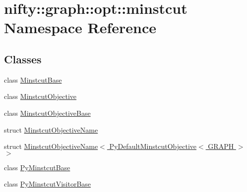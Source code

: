 \hypertarget{namespacenifty_1_1graph_1_1opt_1_1minstcut}{}\section{nifty\+:\+:graph\+:\+:opt\+:\+:minstcut Namespace Reference}
\label{namespacenifty_1_1graph_1_1opt_1_1minstcut}
\subsection*{Classes}
\begin{DoxyCompactItemize}
\item 
class \hyperlink{classnifty_1_1graph_1_1opt_1_1minstcut_1_1MinstcutBase}{Minstcut\+Base}
\item 
class \hyperlink{classnifty_1_1graph_1_1opt_1_1minstcut_1_1MinstcutObjective}{Minstcut\+Objective}
\item 
class \hyperlink{classnifty_1_1graph_1_1opt_1_1minstcut_1_1MinstcutObjectiveBase}{Minstcut\+Objective\+Base}
\item 
struct \hyperlink{structnifty_1_1graph_1_1opt_1_1minstcut_1_1MinstcutObjectiveName}{Minstcut\+Objective\+Name}
\item 
struct \hyperlink{structnifty_1_1graph_1_1opt_1_1minstcut_1_1MinstcutObjectiveName_3_01PyDefaultMinstcutObjective_3_01GRAPH_01_4_01_4}{Minstcut\+Objective\+Name$<$ Py\+Default\+Minstcut\+Objective$<$ G\+R\+A\+P\+H $>$ $>$}
\item 
class \hyperlink{classnifty_1_1graph_1_1opt_1_1minstcut_1_1PyMinstcutBase}{Py\+Minstcut\+Base}
\item 
class \hyperlink{classnifty_1_1graph_1_1opt_1_1minstcut_1_1PyMinstcutVisitorBase}{Py\+Minstcut\+Visitor\+Base}
\end{DoxyCompactItemize}

